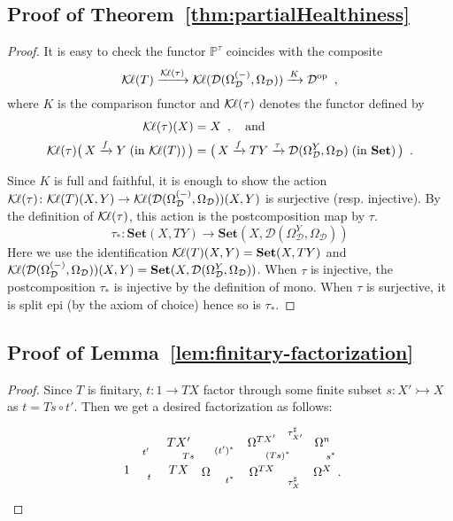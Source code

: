 \documentclass[9pt, preprint]{sigplanconf}
\theoremstyle{theorem}
\theoremstyle{definition}
\newcommand{\cat}[1]{\mathcal{#1}}
\newcommand{\xxto}{\xrightarrow}
\newcommand{\into}{\rightarrowtail}
\newcommand{\place}{{-}}
\newcommand{\op}{\mathrm{op}}
\newcommand{\Set}{\mathbf{Set}}
\newcommand{\Sets}{\Set}
\newcommand{\Kl}{\mathcal{K}{\kern-.2ex}\ell}
\newcommand{\OmegaD}{\Omega_{\cat{D}}}
\newcommand{\bbP}{\mathbb{P}}
\begin{document}
\subsection{Proof of Theorem~\ref{thm:partialHealthiness}}
\begin{proof}
  It is easy to check
  the functor $\bbP^{\tau}$ coincides with the composite
  \begin{equation}
    \Kl(T) \xxto{\Kl(\tau)} \Kl(\cat{D}(\OmegaD^{(\place)}, \OmegaD))
      \xxto{K} \cat{D}^{\op} \enspace ,
  \end{equation}
  where $K$ is the comparison functor and $\Kl(\tau)$
  denotes the functor defined by
  \begin{align*}
    \Kl(\tau) (X) &= X \enspace , \quad \text{and} \\
    \Kl(\tau) \bigl(\,X \xxto{f} Y \;\text{(in $\Kl(T)$)}\,\bigr) &=
      \bigl(\,X \xxto{f} TY \xxto{\tau} \cat{D}(\OmegaD^{Y}, \OmegaD)
 \;\text{(in $\Sets$)}
\,\bigr)\enspace.
  \end{align*}

  Since $K$ is full and faithful,
  it is enough to show the action
  $\Kl(\tau) \colon \Kl(T)(X, Y) \to \Kl(\cat{D}(\OmegaD^{(\place)}, \OmegaD))(X, Y)$
  is surjective (resp. injective).
  By the definition of $\Kl(\tau)$,
  this action is the postcomposition map by $\tau$.
  \begin{equation}
    \tau_{*} \colon \Set(X, TY) \to \Set(X, \cat{D}(\OmegaD^{Y}, \OmegaD))
  \end{equation}
  Here we use the identification
  $\Kl(T)(X, Y) = \Set(X, TY)$ and
  $\Kl(\cat{D}(\OmegaD^{(\place)}, \OmegaD))(X, Y) = \Set(X, \cat{D}(\OmegaD^{Y}, \OmegaD))$.
  When $\tau$ is injective, the postcomposition $\tau_{*}$
  is injective by the definition of mono.
  When $\tau$ is surjective, it is split epi (by the axiom of choice)
  hence so is $\tau_{*}$.
\end{proof}

\subsection{Proof of Lemma~\ref{lem:finitary-factorization}}
\begin{proof}
  Since $T$ is finitary, $t \colon 1 \to TX$ factor through
  some finite subset $s \colon X' \into X$ as $t = Ts \circ t'$.
  Then we get a desired factorization as follows:
  \begin{align*}
    \xymatrix@R-1.5em{
      & TX' \ar[d]^-{Ts} \\
      1 \ar[ur]^-{t'} \ar[r]_-{t}
      & TX
    }
    \xymatrix@R-1.5em{
      & \Omega^{TX'} \ar[dl]_-{(t')^*}
      & \Omega^{n} \ar[l]_-{\tau^{\sharp}_{X'}} \\
      \Omega
      & \Omega^{TX} \ar[l]^-{t^*} \ar[u]_-{(Ts)^*}
      & \Omega^{X} \ar[u]_-{s^*} \ar[l]^-{\tau^{\sharp}_X} \mathrlap{\enspace .}
    }
  \end{align*}
\vspace{-2em}
\end{proof}
\end{document}
